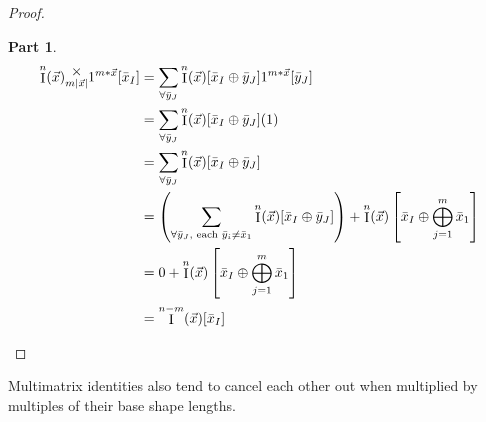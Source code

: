 \documentclass[12pt]{book}
\theoremstyle{plain}
\theoremstyle{definition}
\theoremstyle{ppart}
\newtheorem{ppart}{Part}
\theoremstyle{case}
\theoremstyle{solution}
\DeclareMathOperator{\Ident}{I}
\newcommand{\mmult}[1]{\text{\raisebox{1ex}{$\underset{#1}{\times}$}}}
\newcommand{\shape}[1]{\left|#1\right|}
\begin{document}
\begin{proof}
\begin{ppart}
\begin{align*}
  \Ident^n(\vec{x}) \mmult{m \shape{\vec{x}}} 1^{m*\vec{x}} [\bar{x}_I] &=
  \sum_{\forall \bar{y}_J} \Ident^n(\vec{x})[\bar{x}_I \oplus \bar{y}_J] 1^{m*\vec{x}}[\bar{y}_J] \\
  &=
  \sum_{\forall \bar{y}_J} \Ident^n(\vec{x})[\bar{x}_I \oplus \bar{y}_J] (1) \\
  &=
  \sum_{\forall \bar{y}_J} \Ident^n(\vec{x})[\bar{x}_I \oplus \bar{y}_J] \\
  &=
  \left(
    \sum_{\forall \bar{y}_J, \text{ each } \bar{y}_i \ne \bar{x}_1} \Ident^n(\vec{x})[\bar{x}_I \oplus \bar{y}_J]
  \right)
  + \Ident^n(\vec{x})\left[\bar{x}_I \oplus \bigoplus_{j=1}^m \bar{x}_1 \right] \\
  &= 0 + \Ident^n(\vec{x})\left[\bar{x}_I \oplus \bigoplus_{j=1}^m \bar{x}_1 \right] \\
  &= \Ident^{n-m}(\vec{x})[\bar{x}_I]
\end{align*}
\end{ppart}
\end{proof}

Multimatrix identities also tend to cancel each other out when multiplied by
multiples of their base shape lengths.
\end{document}
